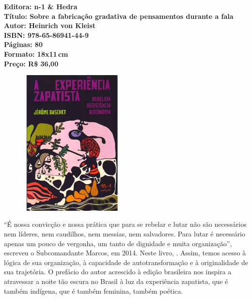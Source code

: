 \hspace*{-.4cm}\begin{minipage}[c]{.5\linewidth}
\small\textbf{
\hspace*{-.1cm}Editora: n-1 \& Hedra\\
Título: Sobre a fabricação gradativa de pensamentos durante a fala\\
Autor: Heinrich von Kleist\\ 
ISBN: 978-65-86941-44-9\\
Páginas: 80\\
Formato: 18x11\,cm\\
Preço: R\$ 36,00\\
}
\end{minipage}

\pagebreak

\begin{center}
\hspace*{.5cm}\includegraphics[width=74mm]{./CAPAS/N-1_EXPERIENCIA.jpg}
\end{center}

\hspace*{-7cm}\hrulefill\hspace*{-7cm}

\medskip

\noindent{}``É nossa convicção e nossa prática que para se rebelar e lutar não são necessários nem líderes, nem caudilhos, nem messias, nem salvadores. Para lutar é necessário apenas um pouco de vergonha, um tanto de dignidade e muita organização'', escreveu o Subcomandante Marcos, em 2014. Neste livro, . Assim, temos acesso à lógica de sua organização, à capacidade de autotransformação e à originalidade de sua trajetória. O prefácio do autor acrescido à edição brasileira nos inspira a atravessar a noite tão escura no Brasil à luz da experiência zapatista, que é também indígena, que é também feminina, também poética.

